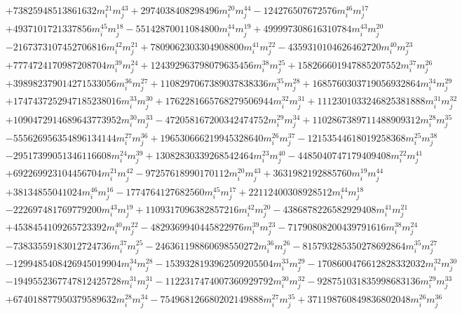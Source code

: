 {\begin{align*}
&+73825948513861632m_i^{21}m_j^{43}+2974038408298496m_i^{20}m_j^{44}-124276507672576m_i^{46}m_j^{17}\\
&+4937101721337856m_i^{45}m_j^{18}-55142870011084800m_i^{44}m_j^{19}+499997308616310784m_i^{43}m_j^{20}\\
&-2167373107452706816m_i^{42}m_j^{21}+7809062303304908800m_i^{41}m_j^{22}-4359310104626462720m_i^{40}m_j^{23}\\
&+7774724170987208704m_i^{39}m_j^{24}+124392963798079635456m_i^{38}m_j^{25}+158266601947885207552m_i^{37}m_j^{26}\\
&+398982379014271533056m_i^{36}m_j^{27}+1108297067389037838336m_i^{35}m_j^{28}+1685760303719056932864m_i^{34}m_j^{29}\\
&+1747437252947185238016m_i^{33}m_j^{30}+1762281665768279506944m_i^{32}m_j^{31}+1112301033246825381888m_i^{31}m_j^{32}\\
&+1090472914689643773952m_i^{30}m_j^{33}-472058167200342474752m_i^{29}m_j^{34}+1102867389711488909312m_i^{28}m_j^{35}\\
&-555626956354896134144m_i^{27}m_j^{36}+196530666219945328640m_i^{26}m_j^{37}-12153544618019258368m_i^{25}m_j^{38}\\
&-29517399051346116608m_i^{24}m_j^{39}+13082830339268542464m_i^{23}m_j^{40}-4485040747179409408m_i^{22}m_j^{41}\\
&+692269923104456704m_i^{21}m_j^{42}-97257618990170112m_i^{20}m_j^{43}+3631982192885760m_i^{19}m_j^{44}\\
&+38134855041024m_i^{46}m_j^{16}-1774764127682560m_i^{45}m_j^{17}+22112400308928512m_i^{44}m_j^{18}\\
&-222697481769779200m_i^{43}m_j^{19}+1109317096382857216m_i^{42}m_j^{20}-4386878226582929408m_i^{41}m_j^{21}\\
&+4538454109265723392m_i^{40}m_j^{22}-4829369940445822976m_i^{39}m_j^{23}-71790808200439791616m_i^{38}m_j^{24}\\
&-73833559183012724736m_i^{37}m_j^{25}-246361198860698550272m_i^{36}m_j^{26}-815793285350278692864m_i^{35}m_j^{27}\\
&-1299485408426945019904m_i^{34}m_j^{28}-1539328193962509205504m_i^{33}m_j^{29}-1708600476612828332032m_i^{32}m_j^{30}\\
&-1949552367747812425728m_i^{31}m_j^{31}-1122317474007360929792m_i^{30}m_j^{32}-928751031835998683136m_i^{29}m_j^{33}\\
&+674018877950379589632m_i^{28}m_j^{34}-754968126680202149888m_i^{27}m_j^{35}+371198760849836802048m_i^{26}m_j^{36}\\

\end{align*}}
